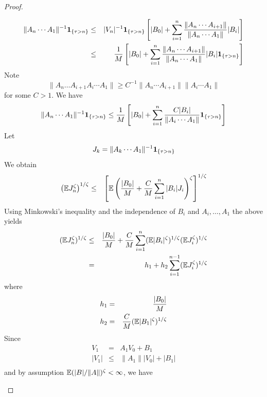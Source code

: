 \documentclass[aoas,preprint]{imsart}
\numberwithin{equation}{section}
\theoremstyle{plain}
\begin{document}
\begin{proof}
\begin{enumerate}
\begin{eqnarray*}
      \|A_n \cdots A_1\|^{-1} \mathbf{1}_{\{\tau > n\}}
      &\leq& |V_n|^{-1} \mathbf{1}_{\{\tau > n\}}
      \left[
        |B_0| + \sum_{i=1}^n {
          \|A_n \cdots A_{i+1}\|
          \over
          \|A_n \cdots A_{1}\|
        } |B_i|
      \right] \\
      &\leq& {1 \over M}
      \left[
        |B_0| + \sum_{i=1}^n {
          \|A_n \cdots A_{i+1}\|
          \over
          \|A_n \cdots A_{1}\|
        } |B_i| \mathbf{1}_{\{\tau > n\}}
      \right]
    \end{eqnarray*}
    Note
    \[
    \|A_n \dots A_{i+1} A_i \cdots A_1\| \geq
    C^{-1} \|A_n \cdots A_{i+1}\|
    \|A_i \cdots A_{1}\|
    \]
    for some $C > 1$. We have
    \begin{equation}
      \label{eq:lower_bound}
      \|A_n \cdots A_1\|^{-1} \mathbf{1}_{\{\tau > n\}}
      \leq
      {1 \over M} \left[
        |B_0| + \sum_{i=1}^n {
          C |B_i|
          \over
          \|A_i \cdots A_1\|
        }  \mathbf{1}_{\{\tau > n\}}
      \right]
    \end{equation}
    Let
    \[
    J_k = \|A_k \cdots A_1\|^{-1} \mathbf{1}_{\{\tau > n\}}
    \]
    We obtain
    \begin{eqnarray*}
      \left(
        \mathbb{E} J_n^\zeta
      \right)^{1/\zeta} &\leq& \left[
        \mathbb{E} \left(
          {|B_0| \over M}
          + {C \over M} \sum_{i=1}^n |B_i| J_i
        \right)^\zeta
        \right]^{1/\zeta}
    \end{eqnarray*}
    Using Minkowski's inequality and the independence of $B_i$ and
    $A_i, \dots, A_1$ the above yields
    \begin{eqnarray}
      (\mathbb{E} J_n^\zeta)^{1/\zeta} &\leq&
      {|B_0| \over M} + {C \over M}
      \sum_{i=1}^n
      (\mathbb{E} |B_i|^\zeta)^{1/\zeta}
      (\mathbb{E} J_i^\zeta)^{1/\zeta}
      \label{eq:neg_pow_ub} \\
      &=& h_1 + h_2 \sum_{i=1}^{n-1} (\mathbb{E} J_i^\zeta)^{1/\zeta}
      \nonumber
    \end{eqnarray}
    where
    \begin{eqnarray*}
      h_1 &=& {|B_0| \over M} \\
      h_2 &=& {C \over M} (\mathbb{E} |B_1|^\zeta)^{1/\zeta}
    \end{eqnarray*}
    Since
    \begin{eqnarray*}
      V_1 &=& A_1 V_0 + B_1 \\
      |V_1| &\leq& \|A_1\| |V_0| + |B_1| \\
      \end{eqnarray*}
      and by assumption $\mathbb{E} (|B|/\|A\|)^\zeta < \infty$, we have

\end{enumerate}
\end{proof}
\end{document}
